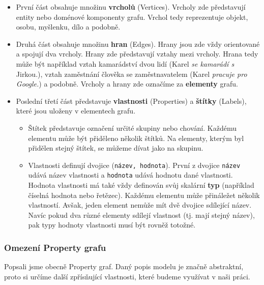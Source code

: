 \begin{itemize}
\item První část obsahuje množinu \textbf{vrcholů} (Vertices).
Vrcholy zde představují entity nebo doménové komponenty grafu.
Vrchol tedy reprezentuje objekt, osobu, myšlenku, dílo a podobně.

\item Druhá část obsahuje množinu \textbf{hran} (Edges).
Hrany jsou zde vždy orientované a spojují dva vrcholy.
Hrany zde představují vztahy mezi vrcholy.
Hrana tedy může být například vztah kamarádství dvou lidí (Karel \textit{se kamarádí s} Jirkou.), vztah zaměstnání člověka se zaměstnavatelem (Karel \textit{pracuje pro Google.}) a podobně.
Vrcholy a hrany zde označíme za \textbf{elementy} grafu.
\item Poslední třetí část představuje \textbf{vlastnosti} (Properties) a \textbf{štítky} (Labels), které jsou uloženy v elementech grafu.

\begin{itemize}
\item
Štítek představuje označení určité skupiny nebo chování.
Každému elementu může být přiděleno několik štítků.
Na elementy, kterým byl přidělen stejný štítek, se můžeme dívat jako na skupinu.

\item
Vlastnosti definují dvojice (\texttt{název, hodnota}).
První z dvojice \texttt{název} udává název vlastnosti a \texttt{hodnota} udává hodnotu dané vlastnosti.
Hodnota vlastnosti má také vždy definován svůj skalární \textbf{typ} (například číselná hodnota nebo řetězec).
Každému elementu může přináležet několik vlastností.
Avšak, jeden element nemůže mít dvě dvojice sdílející název.
Navíc pokud dva různé elementy sdílejí vlastnost (tj. mají stejný název), pak typy hodnoty vlastnosti musí být rovněž totožné.
\end{itemize}
\end{itemize}

\subsubsection{Omezení Property grafu}
Popsali jsme obecně Property graf.
Daný popis modelu je značně abstraktní, proto si určíme další zpřísňující vlastnosti, které budeme využívat v naši práci.

